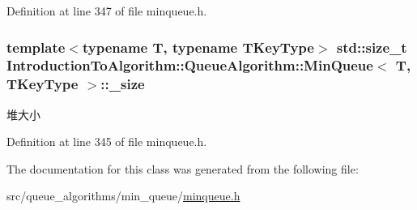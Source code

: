 Definition at line 347 of file minqueue.\+h.

\hypertarget{class_introduction_to_algorithm_1_1_queue_algorithm_1_1_min_queue_a0de92802e37516dda2c01de776aba641}{}
\subsubsection[{\+\_\+size}]{\setlength{\rightskip}{0pt plus 5cm}template$<$typename T, typename T\+Key\+Type$>$ std\+::size\+\_\+t {\bf Introduction\+To\+Algorithm\+::\+Queue\+Algorithm\+::\+Min\+Queue}$<$ T, T\+Key\+Type $>$\+::\+\_\+size\hspace{0.3cm}{\ttfamily [private]}}\label{class_introduction_to_algorithm_1_1_queue_algorithm_1_1_min_queue_a0de92802e37516dda2c01de776aba641}
堆大小 

Definition at line 345 of file minqueue.\+h.



The documentation for this class was generated from the following file\+:\begin{DoxyCompactItemize}
\item 
src/queue\+\_\+algorithms/min\+\_\+queue/\hyperlink{minqueue_8h}{minqueue.\+h}\end{DoxyCompactItemize}

